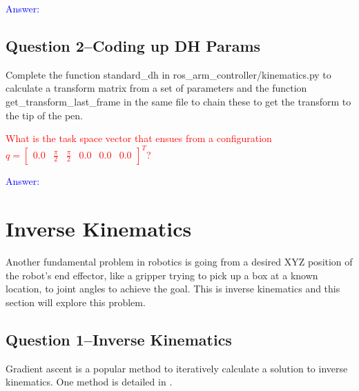 \documentclass[11pt,a4paper]{article}
\begin{document}
\textcolor{blue}{Answer: }


\subsection{Question 2--Coding up DH Params}

Complete the function standard\_dh in ros\_arm\_controller/kinematics.py to calculate a transform matrix from a set of parameters and the function get\_transform\_last\_frame in the same file to chain these to get the transform to the tip of the pen.

\textcolor{red}{ What is the task space vector that ensues from a configuration $q = \begin{bmatrix} 0.0& \frac{\pi}{2}& \frac{\pi}{2}& 0.0& 0.0& 0.0 \end{bmatrix}^T$? }

\textcolor{blue}{Answer: }


\clearpage
\section{Inverse Kinematics}

Another fundamental problem in robotics is going from a desired XYZ position of the robot's end effector, like a gripper trying to pick up a box at a known location, to joint angles to achieve the goal. This is inverse kinematics and this section will explore this problem.

\subsection{Question 1--Inverse Kinematics}
Gradient ascent is a popular method to iteratively calculate a solution to inverse kinematics. One method is detailed in \cite{wolovich1984computational}. 
\end{document}
